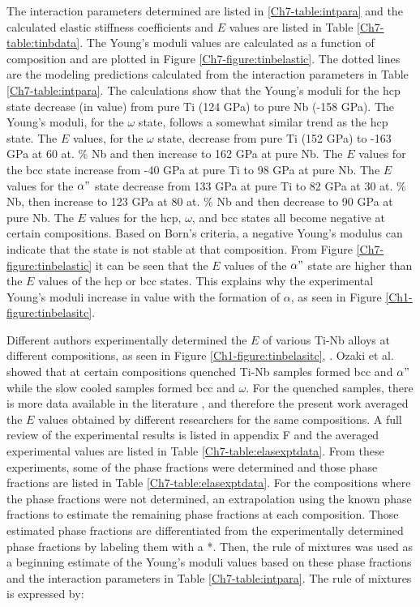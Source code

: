 The interaction parameters determined are listed in \ref{Ch7-table:intpara} and the calculated elastic stiffness coefficients and $E$ values are listed in Table \ref{Ch7-table:tinbdata}. The Young's moduli values are calculated as a function of composition and are plotted in Figure \ref{Ch7-figure:tinbelastic}. The dotted lines are the modeling predictions calculated from the interaction parameters in Table \ref{Ch7-table:intpara}. The calculations show that the Young's moduli for the hcp state decrease (in value) from pure Ti (124 GPa) to pure Nb (-158 GPa). The Young's moduli, for the $\omega$ state, follows a somewhat similar trend as the hcp state. The $E$ values, for the $\omega$ state, decrease from pure Ti (152 GPa) to -163 GPa at 60 at. \% Nb and then increase to 162 GPa at pure Nb. The $E$ values for the bcc state increase from -40 GPa at pure Ti to 98 GPa at pure Nb. The $E$ values for the $\alpha"$ state decrease from 133 GPa at pure Ti to 82 GPa at 30 at. \% Nb, then increase to 123 GPa at 80 at. \% Nb and then decrease to 90 GPa at pure Nb. The $E$ values for the hcp, $\omega$, and bcc states all become negative at certain compositions. Based on Born's criteria, a negative Young's modulus can indicate that the state is not stable at that composition. From Figure \ref{Ch7-figure:tinbelastic} it can be seen that the $E$ values of the $\alpha"$ state are higher than the $E$ values of the hcp or bcc states. This explains why the experimental Young's moduli increase in value with the formation of $\alpha$, as seen in Figure \ref{Ch1-figure:tinbelasitc}. 

Different authors experimentally determined the $E$ of various Ti-Nb alloys at different compositions, as seen in Figure \ref{Ch1-figure:tinbelasitc}, \cite{Friak2012,Timoshevskii2011,Friak2012,Karre2015}. Ozaki et al. \cite{Ozaki2004} showed that at certain compositions quenched Ti-Nb samples formed bcc and $\alpha"$ while the slow cooled samples formed bcc and $\omega$. For the quenched samples, there is more data available in the literature \cite{Friak2012,Timoshevskii2011,Friak2012,Karre2015}, and therefore the present work averaged the $E$ values obtained by different researchers for the same compositions. A full review of the experimental results is listed in appendix F and the averaged experimental values are listed in Table \ref{Ch7-table:elasexptdata}. From these experiments, some of the phase fractions were determined \cite{Friak2012} and those phase fractions are listed in Table \ref{Ch7-table:elasexptdata}. For the compositions where the phase fractions were not determined, an extrapolation using the known phase fractions to estimate the remaining phase fractions at each composition. Those estimated phase fractions are differentiated from the experimentally determined phase fractions by labeling them with a *. Then, the rule of mixtures was used as a beginning estimate of the Young's moduli values based on these phase fractions and the interaction parameters in Table \ref{Ch7-table:intpara}. The rule of mixtures is expressed by:

